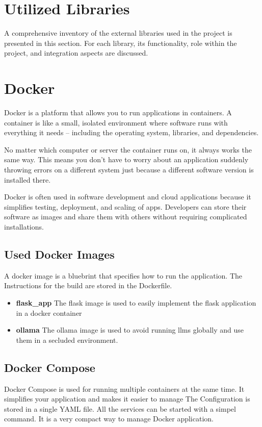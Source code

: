\section{Utilized Libraries}
A comprehensive inventory of the external libraries used in the project is presented in this section. For each library, its functionality, role within the project, and integration aspects are discussed.


\section{Docker}
Docker is a platform that allows you to run applications in containers. A container is like a small, isolated environment where software runs with everything it needs – including the operating system, libraries, and dependencies.

No matter which computer or server the container runs on, it always works the same way. This means you don’t have to worry about an application suddenly throwing errors on a different system just because a different software version is installed there.

Docker is often used in software development and cloud applications because it simplifies testing, deployment, and scaling of apps. Developers can store their software as images and share them with others without requiring complicated installations.

\subsection{Used Docker Images}
A docker image is a bluebrint that specifies how to run the application. The Instructions for the build are stored in the Dockerfile.
\cite{dockerize_flask} 

\begin{itemize}
    \item \textbf{flask_app} The flask image is used to easily implement the flask application in a docker container
    \item \textbf{ollama} The ollama image is used to avoid running llms globally and use them in a secluded environment.
\end{itemize}

\subsection{Docker Compose}
Docker Compose is used for running multiple containers at the same time. It simplifies your application and makes it easier to manage 
The Configuration is stored in a single YAML file. All the services can be started with a simpel command. It is a very compact way to manage Docker application.
\cite{docker_compose} 

